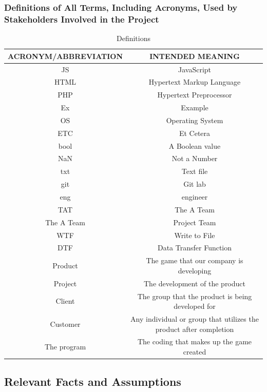 \documentclass[11pt, oneside]{article}   	%
\begin{document}
\subsubsection{Definitions of All Terms, Including Acronyms, Used by Stakeholders Involved in the Project}
\begin{table}[H]
\caption{Definitions}
\begin{center}
\begin{tabular}{|c|c|}
\hline
\hline
ACRONYM/ABBREVIATION & INTENDED MEANING\\
\hline
JS & JavaScript\\
\hline
HTML &Hypertext Markup Language\\
\hline
PHP & Hypertext Preprocessor\\
\hline
Ex & Example\\
\hline
OS & Operating System\\
\hline
ETC & Et Cetera\\
\hline
bool & A Boolean value\\
\hline
NaN & Not a Number\\
\hline
txt & Text file\\
\hline
git & Git lab\\
\hline
eng & engineer\\
\hline
TAT & The A Team\\
\hline
The A Team & Project Team\\
\hline
WTF & Write to File\\
\hline
DTF & Data Transfer Function\\
\hline
Product & The game that our company is developing\\
\hline
Project & The development of the product\\
\hline
Client & The group that the product is being developed for\\
\hline
Customer & Any individual or group that utilizes the product after completion\\
\hline
The program & The coding that makes up the game created\\
\hline
\hline
\end{tabular}
\end{center}
\label{default}
\end{table}%



\subsection{Relevant Facts and Assumptions}
\end{document}
